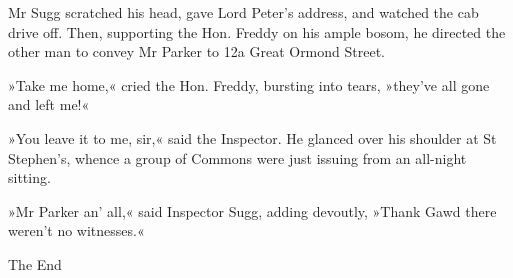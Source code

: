 Mr Sugg scratched his head, gave Lord Peter's address, and watched the cab drive off. Then, supporting the Hon. Freddy on his ample bosom, he directed the other man to convey Mr Parker to 12a Great Ormond Street.

»Take me home,« cried the Hon. Freddy, bursting into tears, »they've all gone and left me!«

»You leave it to me, sir,« said the Inspector. He glanced over his shoulder at St Stephen's, whence a group of Commons were just issuing from an all-night sitting.

»Mr Parker an' all,« said Inspector Sugg, adding devoutly, »Thank Gawd there weren't no witnesses.«
\vfill

\begin{center}\mytitlefont\reasonablyhuge
	The End
\end{center}
